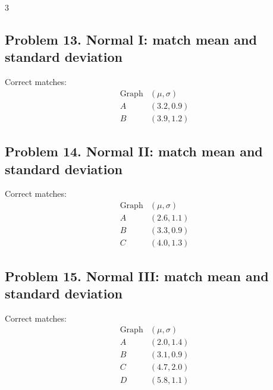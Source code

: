\begin{multicols}{3}
\subsection*{Problem 13. Normal I: match mean and standard deviation}
Correct matches:
\[
\begin{array}{c|c}
\text{Graph} & (\mu,\sigma) \\
\hline
A & (3.2,0.9) \\
B & (3.9,1.2)
\end{array}
\]

\subsection*{Problem 14. Normal II: match mean and standard deviation}
Correct matches:
\[
\begin{array}{c|c}
\text{Graph} & (\mu,\sigma) \\
\hline
A & (2.6,1.1) \\
B & (3.3,0.9) \\
C & (4.0,1.3)
\end{array}
\]

\subsection*{Problem 15. Normal III: match mean and standard deviation}
Correct matches:
\[
\begin{array}{c|c}
\text{Graph} & (\mu,\sigma) \\
\hline
A & (2.0,1.4) \\
B & (3.1,0.9) \\
C & (4.7,2.0) \\
D & (5.8,1.1)
\end{array}
\]

\end{multicols}

